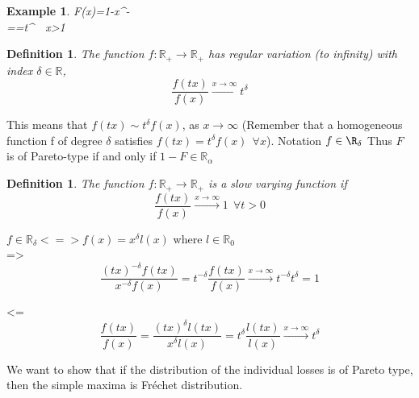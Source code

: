 \documentclass[11pt,a4paper,oneside]{article}\usepackage[]{graphicx}\usepackage[]{color}
\newtheorem{exm}{Example}[subsection]
\newtheorem{defi}[subsection]{Definition}
\begin{document}
\begin{exm}
F(x)=1-x^{-\alpha}\\
==t^{\alpha}\ \ \forall x>1
\end{exm}


\begin{defi}
The function $f:\mathbb{R}_{+}\rightarrow \mathbb{R}_{+}$ has regular variation (to infinity) with index $\delta\in\mathbb{R}$,
$$\frac{f(tx)}{f(x)}\xrightarrow{x\rightarrow\infty}t^{\delta}$$
\end{defi}
This means that $f(tx)\sim t^{\delta}f(x)$, as $x\rightarrow\infty$ (Remember that a homogeneous function f of degree $\delta$ satisfies $f(tx)=t^{\delta}f(x)\ \ \forall x$).
 Notation $f\in\R_{\delta}$ Thus $F$ is of Pareto-type if and only if $1-F\in\mathbb{R}_{\alpha}$
 
 \begin{defi}
 The function $f:\mathbb{R}_+\rightarrow\mathbb{R}_+$ is a slow varying function if
 $$\frac{f(tx)}{f(x)}\xrightarrow{x\rightarrow\infty}1\ \ \forall t>0$$
 \end{defi}
 
 $f\in\mathbb{R}_{\delta}<=> f(x)=x^{\delta}l(x)$ where $l\in\mathbb{R}_0$\\
 =>
$$\frac{(tx)^{-\delta}f(tx)}{x^{-\delta}f(x)}=t^{-\delta}\frac{f(tx)}{f(x)}\xrightarrow{x\rightarrow\infty}t^{-\delta}t^{\delta}=1$$
  
  <=
 $$\frac{f(tx)}{f(x)}
  =\frac{(tx)^{\delta}l(tx)}{x^{\delta}l(x)}
 =t^{\delta}\frac{l(tx)}{l(x)}\xrightarrow{x\rightarrow\infty}t^{\delta}
$$

We want to show that if the distribution of the individual losses is of Pareto type, then the simple maxima is Fréchet distribution.
\end{document}
